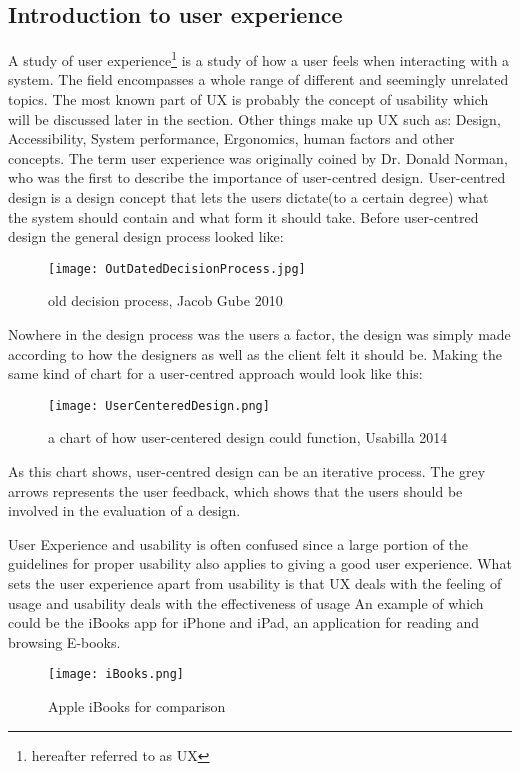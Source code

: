 \subsection{Introduction to user experience }\label{UXIntro}
A study of user experience\footnote{hereafter referred to as UX} is a study of how a user feels when interacting with a system. The field encompasses a whole range of different and seemingly unrelated topics. The most known part of UX is probably the concept of usability which will be discussed later in the section. Other things make up UX such as: Design, Accessibility, System performance, Ergonomics, human factors and other concepts\cite{UXIntro}. The term user 
experience  was originally coined by Dr. Donald Norman, who was the first to describe the importance of user-centred design. User-centred design is a design 
concept that lets the users dictate(to a certain degree) what the system should contain and what form it should take. Before user-centred design the general design process looked like:
\begin{figure}[H]
\centering
\texttt{[image: OutDatedDecisionProcess.jpg]}
\caption{old decision process, Jacob Gube 2010}
\end{figure}
Nowhere in the design process was the users a factor, the design was simply made according to how the designers as well as the client felt it should be. Making the same kind of chart for a user-centred approach would look like this:\\
\begin{figure}[H]
\centering
\texttt{[image: UserCenteredDesign.png]}
\caption{a chart of how user-centered design could function, Usabilla 2014}
\end{figure}
As this chart shows, user-centred design can be an iterative process. The grey arrows represents the user feedback, which shows that the users should be involved 
in the evaluation of a design.

User Experience and usability is often confused since a large portion of the guidelines for proper usability also applies to giving a good user experience. 
What sets the user experience apart from usability is that UX deals with the feeling of usage and usability deals with the effectiveness of usage
An example of which could be the iBooks app for iPhone and iPad, an application for reading and browsing E-books.
\begin{figure}[H]
\centering
\texttt{[image: iBooks.png]}
\caption{Apple iBooks for comparison}
\end{figure}

